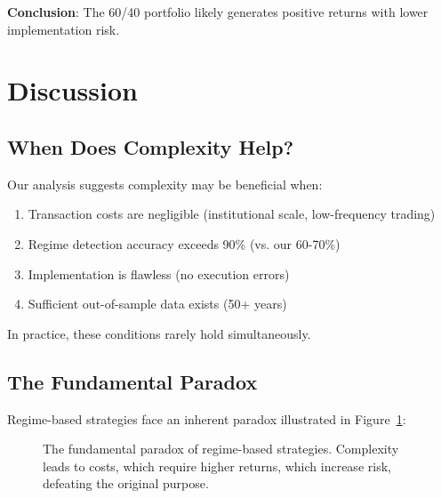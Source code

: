 \documentclass[twocolumn,ieee]{arithmaxresearch}
\begin{document}
\textbf{Conclusion}: The 60/40 portfolio likely generates positive returns with lower implementation risk.

\section{Discussion}

\subsection{When Does Complexity Help?}

Our analysis suggests complexity may be beneficial when:

\begin{enumerate}
    \item Transaction costs are negligible (institutional scale, low-frequency trading)
    \item Regime detection accuracy exceeds 90\% (vs. our 60-70\%)
    \item Implementation is flawless (no execution errors)
    \item Sufficient out-of-sample data exists (50+ years)
\end{enumerate}

In practice, these conditions rarely hold simultaneously.

\subsection{The Fundamental Paradox}

Regime-based strategies face an inherent paradox illustrated in Figure~\ref{fig:paradox}:

\begin{figure}[h]
\centering
{}
\caption{The fundamental paradox of regime-based strategies. Complexity leads to costs, which require higher returns, which increase risk, defeating the original purpose.}
\label{fig:paradox}
\end{figure}
\end{document}
